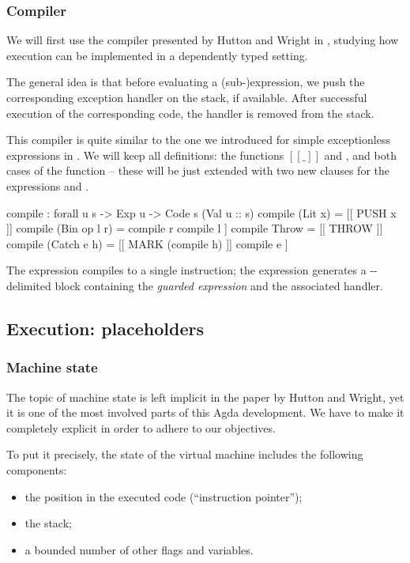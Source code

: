 \subsubsection{Compiler}

We will first use the compiler presented by Hutton and Wright in
\cite{gmh:exceptions}, studying how execution can be implemented in a
dependently typed setting.

The general idea is that before evaluating a (sub-)expression, we push
the corresponding exception handler on the stack, if available. After
successful execution of the corresponding code, the handler is removed
from the stack.

This compiler is quite similar to the one we introduced for simple
exceptionless expressions in . We will keep all
definitions: the functions $[\!\![\_]\!\!]$ and , and both cases
of the function  -- these will be just extended with two new
clauses for the expressions  and .

\label{sec:gmh-ham-compile}\begin{code}
compile : forall {u s} -> Exp u -> Code s (Val u :: s)
compile (Lit x) = [[ PUSH x ]]
compile (Bin op l r) = compile r \app compile l \app [[ opInstr op ]] 
compile Throw = [[ THROW ]]
compile (Catch e h) = [[ MARK (compile h) ]] \app compile e \app [[ UNMARK ]]
\end{code}

The expression  compiles to a single  instruction;
the expression  generates a --delimited
block containing the \emph{guarded expression} and the associated handler.

\subsection{Execution: placeholders}

\subsubsection{Machine state}

The topic of machine state is left implicit in the paper by Hutton and Wright,
yet it is one of the most involved parts of this Agda development. We have to
make it completely explicit in order to adhere to our objectives.

To put it precisely, the state of the virtual machine includes
the following components:
\begin{itemize}
	\item the position in the executed code (``instruction pointer'');
	\item the stack;
	\item a bounded number of other flags and variables.
\end{itemize}

